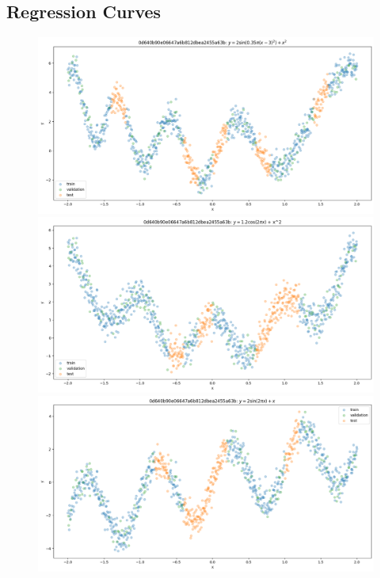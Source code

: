 \documentclass{article}
\numberwithin{equation}{section}
\begin{document}
\newpage
\subsection{Regression Curves}\label{appendix:toy-curves}
\begin{figure}[h!]
\centering
\begin{minipage}{.49\textwidth}
  \centering
  \includegraphics[width=\linewidth]{thesis-report/figures/toy_curves/data/curve0/data.png}
  \includegraphics[width=\linewidth]{thesis-report/figures/toy_curves/data/curve2/data.png}
  \includegraphics[width=\linewidth]{thesis-report/figures/toy_curves/data/curve4/data.png}

\end{minipage}
\end{figure}
\end{document}
